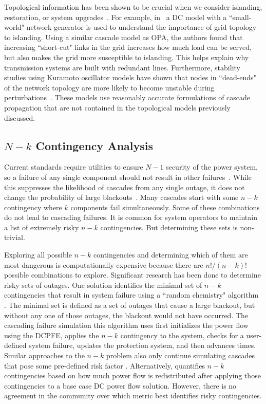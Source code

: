 Topological information has been shown to be crucial when we consider islanding, restoration, or system upgrades~\cite{restoration}\cite{islanding}.  For example, in~\cite{top_Pepyne}  a DC model with a ``small-world" network generator is used to understand the importance of grid topology to islanding.  Using a similar cascade model as OPA, the authors found that increasing ``short-cut" links in the grid increases how much load can be served, but also makes the grid more susceptible to islanding. This helps explain why transmission systems are built with redundant lines.  Furthermore, stability studies using Kuramoto oscillator models have shown that nodes in ``dead-ends" of the network topology are more likely to become unstable during perturbations~\cite{kurths}. These models use reasonably accurate formulations of cascade propagation that are not contained in the topological models previously discussed.  



\subsection{$N-k$ Contingency Analysis}

Current standards require utilities to ensure $N-1$ security of the power system, so a failure of any single component should not result in other failures~\cite{nerc_stand}.  While this suppresses the likelihood of cascades from any single outage, it does not change the probability of large blackouts~\cite{OPA_req}.  Many cascades start with some $n-k$ contingency where $k$ components fail simultaneously.  Some of these combinations do not lead to cascading failures.  It is common for system operators to maintain a list of extremely risky $n-k$ contingencies.  But determining these sets is non-trivial.

Exploring all possible $n-k$ contingencies and determining which of them are most dangerous is computationally expensive because there are $n!/(n-k)!$ possible combinations to explore.  Significant research has been done to determine risky sets of outages.  One solution identifies the minimal set of $n-k$ contingencies that result in system failure using a ``random chemistry" algorithm~\cite{random_chemistry} .  The minimal set is defined as a set of outages that cause a large blackout, but without any one of those outages, the blackout would not have occurred.  The cascading failure simulation this algorithm uses first initializes the power flow using the DCPFE, applies the $n-k$ contingency to the system, checks for a user-defined system failure, updates the protection system, and then advances times.  Similar approaches to the $n-k$ problem also only continue simulating cascades that pose some pre-defined risk factor \cite{chen}\cite{donde}\cite{kirschen}.  Alternatively, \cite{Soltan2017} quantifies $n-k$ contingencies based on how much power flow is redistributed after applying those contingencies to a base case DC power flow solution.  However, there is no agreement in the community over which metric best identifies risky contingencies.

